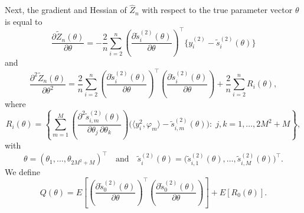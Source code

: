 \documentclass[12pt,a4paper]{article}
\theoremstyle{definition}
\begin{document}
Next, the gradient and Hessian of $\hat{Z}_n$ with respect to the true parameter vector $\theta$ is equal to
\[\frac{\partial \tilde Z_n(\theta)}{\partial \theta}
=-\frac{2}{n}\sum_{i=2}^n
\left(\frac{\partial \tilde s_i^{(2)}(\theta)}{\partial \theta}
\right)^{\!\top}\bigl\{ y_i^{(2)} - \tilde s_i^{(2)}(\theta) \bigr\}
\]
and
\[\frac{\partial^2 \tilde Z_n(\theta)}{\partial \theta^2}=\frac{2}{n}\sum_{i=2}^n
\left(\frac{\partial \tilde s_i^{(2)}(\theta)}{\partial \theta}
\right)^{\!\top}\left(\frac{\partial \tilde s_i^{(2)}(\theta)}{\partial \theta}\right)+\frac{2}{n}\sum_{i=2}^n R_i(\theta),
\]
where
\[
R_i(\theta)=\left\{\sum_{m=1}^M\left(\frac{\partial^2 \tilde s_{i,m}^{(2)}(\theta)}
{\partial \theta_j \, \partial \theta_k}\right)\bigl(\langle y_i^2,\varphi_m\rangle - \tilde s_{i,m}^{(2)}(\theta)\bigr):\;j,k=1,\ldots,2M^2+M
\right\},
\]
with
\[
\theta=(\theta_1,\ldots,\theta_{2M^2+M})^\top\quad\text{and}\quad\tilde s_i^{(2)}(\theta)=\bigl(\tilde s_{i,1}^{(2)}(\theta),\ldots,\tilde s_{i,M}^{(2)}(\theta)\bigr)^\top.
\]
We define
\[
Q(\theta)=E\!\left[\left(\frac{\partial \tilde s_0^{(2)}(\theta)}{\partial \theta}\right)^{\!\top}\left(
\frac{\partial \tilde s_0^{(2)}(\theta)}{\partial \theta}\right)
\right]+E\!\left[ R_0(\theta) \right].
\]
\end{document}
